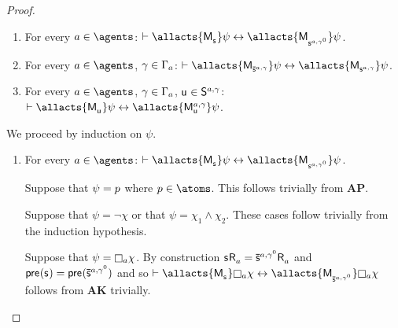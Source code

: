 \begin{proof}
\begin{enumerate}
    \item For every $\agentA \in \agents$: $\proves \allacts{\aPModel{\aStateS}} \psi \iff \allacts{\aPModel{\aStateS[\agentA,\gamma^0]}} \psi$.
    \item For every $\agentA \in \agents$, $\gamma \in \Gamma_a$: $\proves \allacts{\aPModel{\aPStateS[\agentA,\gamma]}} \psi \iff \allacts{\aPModel{\aStateS[\agentA,\gamma]}} \psi$.
    \item For every $\agentA \in \agents$, $\gamma \in \Gamma_a$, $\aStateU \in \aStates[\agentA,\gamma]$: $\proves \allacts{\aPModel{\aStateU}} \psi \iff \allacts{\aPModel[\agentA,\gamma]{\aStateU}} \psi$.
\end{enumerate}

We proceed by induction on $\psi$.

\begin{enumerate}
    \item For every $\agentA \in \agents$: $\proves \allacts{\aPModel{\aStateS}} \psi \iff \allacts{\aPModel{\aStateS[\agentA,\gamma^0]}} \psi$.

        Suppose that $\psi = p$ where $\atomP \in \atoms$. 
        This follows trivially from {\bf AP}.

        Suppose that $\psi = \neg \chi$ or that $\psi = \chi_1 \land \chi_2$.
        These cases follow trivially from the induction hypothesis.

        Suppose that $\psi = \necessary[\agentA] \chi$.
        By construction $\aStateS \aAccessibility{\agentA} = \aPStateS[\agentA,\gamma^0] \aAccessibility{\agentA}$ and $\aPrecondition(\aStateS) = \aPrecondition(\aPStateS[\agentA,\gamma^0])$ and so $\proves \allacts{\aPModel{\aStateS}} \necessary[\agentA] \chi \iff \allacts{\aPModel{\aPStateS[\agentA,\gamma^0]}} \necessary[\agentA] \chi$ follows from {\bf AK} trivially.


\end{enumerate}
\end{proof}
